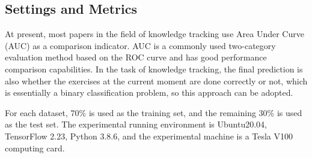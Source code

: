 \subsection{Settings and Metrics}
At present, most papers in the field of knowledge tracking use Area Under Curve (AUC) as a comparison indicator. AUC is a commonly used two-category evaluation method based on the ROC curve and has good performance comparison capabilities. In the task of knowledge tracking, the final prediction is also whether the exercises at the current moment are done correctly or not, which is essentially a binary classification problem, so this approach can be adopted.

For each dataset, 70\% is used as the training set, and the remaining 30\% is used as the test set. The experimental running environment is Ubuntu20.04, TensorFlow 2.23, Python 3.8.6, and the experimental machine is a Tesla V100 computing card.


